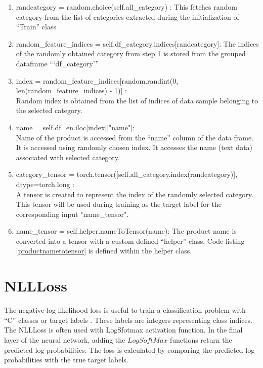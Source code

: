 \begin{enumerate}
    \item randcategory = random.choice(self.all\_category) : This fetches random category from the list of categories extracted during the initialization of ``Train'' class  
    \item random\_feature\_indices = self.df\_category.indices[randcategory]: The indices of the randomly obtained category from step 1 is stored from the grouped dataframe ```df\_category'''
    \item index = random\_feature\_indices[random.randint(0, len(random\_feature\_indices) - 1)] :\\ Random index is obtained from the list of indices of data sample belonging to the selected category.
    \item name = self.df\_en.iloc[index]["name"]:\\ Name of the product is accessed from the ``name'' column of the data frame. It is accessed using randomly chosen index. It accesses the name (text data) associated with selected category.
    \item category\_tensor = torch.tensor([self.all\_category.index(randcategory)], dtype=torch.long : \\ A tensor is created to represent the index of the randomly selected category. This tensor will be used during training as the target label for the corresponding input "name\_tensor".
    \item name\_tensor = self.helper.nameToTensor(name): The product name is converted into a tensor with a custom defined ``helper'' class. Code listing \ref{productnametotensor} is defined within the helper class.
    

\end{enumerate}


\section{\acl{NLLLoss}}

The negative log likelihood loss is useful to train a classification problem with ``C'' classes or target labels \parencite{Paszke.03122019}. These labels are integers representing class indices. The \acl{NLLLoss} is often used with LogSfotmax activation function. In the final layer of the neural network, adding the 
$LogSoftMax$ functions return the predicted log-probabilities. The loss is calculated by comparing the predicted log probabilities with the true target labels. 






